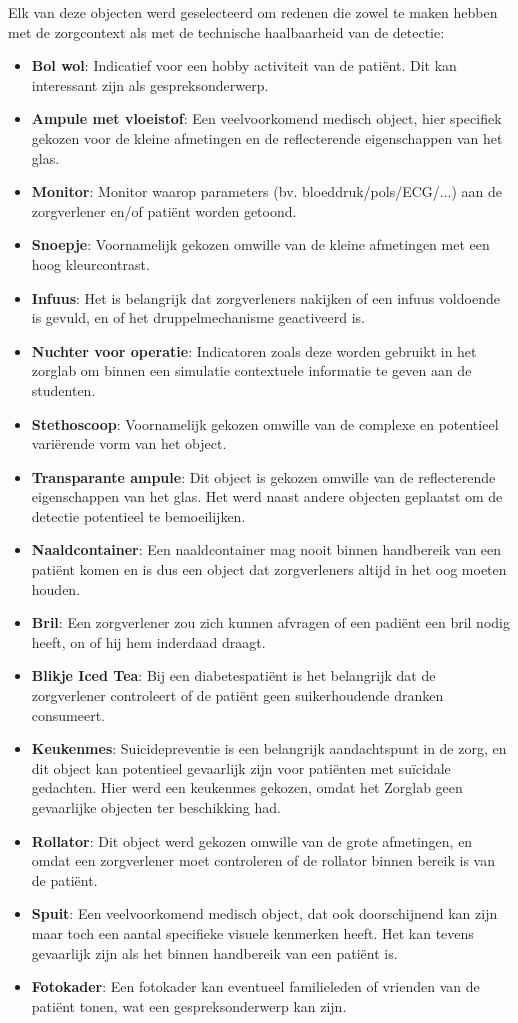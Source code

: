 Elk van deze objecten werd geselecteerd om redenen die zowel te maken hebben met de zorgcontext als met de technische haalbaarheid van de detectie:
\begin{itemize}
  \item \textbf{Bol wol}: Indicatief voor een hobby activiteit van de patiënt. Dit kan interessant zijn als gespreksonderwerp.
  \item \textbf{Ampule met vloeistof}: Een veelvoorkomend medisch object, hier specifiek gekozen voor de kleine afmetingen en de reflecterende eigenschappen van het glas.
  \item \textbf{Monitor}: Monitor waarop parameters (bv. bloeddruk/pols/ECG/...) aan de zorgverlener en/of patiënt worden getoond.
  \item \textbf{Snoepje}: Voornamelijk gekozen omwille van de kleine afmetingen met een hoog kleurcontrast.
  \item \textbf{Infuus}: Het is belangrijk dat zorgverleners nakijken of een infuus voldoende is gevuld, en of het druppelmechanisme geactiveerd is.
  \item \textbf{Nuchter voor operatie}: Indicatoren zoals deze worden gebruikt in het zorglab om binnen een simulatie contextuele informatie te geven aan de studenten.
  \item \textbf{Stethoscoop}: Voornamelijk gekozen omwille van de complexe en potentieel variërende vorm van het object.
  \item \textbf{Transparante ampule}: Dit object is gekozen omwille van de reflecterende eigenschappen van het glas. Het werd naast andere objecten geplaatst om de detectie potentieel te bemoeilijken.
  \item \textbf{Naaldcontainer}: Een naaldcontainer mag nooit binnen handbereik van een patiënt komen en is dus een object dat zorgverleners altijd in het oog moeten houden.
  \item \textbf{Bril}: Een zorgverlener zou zich kunnen afvragen of een padiënt een bril nodig heeft, on of hij hem inderdaad draagt.
  \item \textbf{Blikje Iced Tea}: Bij een diabetespatiënt is het belangrijk dat de zorgverlener controleert of de patiënt geen suikerhoudende dranken consumeert.
  \item \textbf{Keukenmes}: Suicidepreventie is een belangrijk aandachtspunt in de zorg, en dit object kan potentieel gevaarlijk zijn voor patiënten met suïcidale gedachten. Hier werd een keukenmes gekozen, omdat het Zorglab geen gevaarlijke objecten ter beschikking had.
  \item \textbf{Rollator}: Dit object werd gekozen omwille van de grote afmetingen, en omdat een zorgverlener moet controleren of de rollator binnen bereik is van de patiënt.
  \item \textbf{Spuit}: Een veelvoorkomend medisch object, dat ook doorschijnend kan zijn maar toch een aantal specifieke visuele kenmerken heeft. Het kan tevens gevaarlijk zijn als het binnen handbereik van een patiënt is.
  \item \textbf{Fotokader}: Een fotokader kan eventueel familieleden of vrienden van de patiënt tonen, wat een gespreksonderwerp kan zijn.
\end{itemize}

